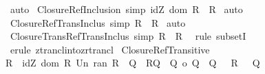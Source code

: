 \begin{isabellebody}
\isamarkupfalse%
\ auto\isanewline
{}\isamarkupfalse%
%
\endisatagproof
{\isafoldproof}%
%
\isadelimproof
\isanewline
%
\endisadelimproof
\isanewline
{}\isamarkupfalse%
\ Closure{\isacharunderscore}Ref{\isacharunderscore}Inclusion\ {\isacharbrackleft}simp{\isacharbrackright}{\isacharcolon}\ {\isachardoublequoteopen}idZ\ {\isacharparenleft}dom\ R{\isacharparenright}\ {\isacharless}{\isacharequal}\ R{\isacharpercent}{\isacharasterisk}{\isachardoublequoteclose}\isanewline
%
\isadelimproof
%
\endisadelimproof
%
\isatagproof
{}\isamarkupfalse%
\ auto\isanewline
{}\isamarkupfalse%
%
\endisatagproof
{\isafoldproof}%
%
\isadelimproof
\ \isanewline
%
\endisadelimproof
\isanewline
{}\isamarkupfalse%
\ Closure{\isacharunderscore}RefTrans{\isacharunderscore}Inclus\ {\isacharbrackleft}simp{\isacharbrackright}{\isacharcolon}\ {\isachardoublequoteopen}R\ {\isacharless}{\isacharequal}\ R{\isacharpercent}{\isacharasterisk}{\isachardoublequoteclose}\isanewline
%
\isadelimproof
%
\endisadelimproof
%
\isatagproof
{}\isamarkupfalse%
\ auto\isanewline
{}\isamarkupfalse%
%
\endisatagproof
{\isafoldproof}%
%
\isadelimproof
\isanewline
%
\endisadelimproof
\isanewline
{}\isamarkupfalse%
\ Closure{\isacharunderscore}Trans{\isacharunderscore}RefTrans{\isacharunderscore}Inclus\ {\isacharbrackleft}simp{\isacharbrackright}{\isacharcolon}\ {\isachardoublequoteopen}R{\isacharpercent}{\isacharplus}\ {\isacharless}{\isacharequal}\ R{\isacharpercent}{\isacharasterisk}\ {\isachardoublequoteclose}\isanewline
%
\isadelimproof
%
\endisadelimproof
%
\isatagproof
{}\isamarkupfalse%
\ {\isacharparenleft}rule\ subsetI{\isacharparenright}\ \isanewline
{}\isamarkupfalse%
\ {\isacharparenleft}erule\ ztrancl{\isacharunderscore}into{\isacharunderscore}zrtrancl{\isacharparenright}\isanewline
{}\isamarkupfalse%
%
\endisatagproof
{\isafoldproof}%
%
\isadelimproof
\isanewline
%
\endisadelimproof
\isanewline
\isanewline
\isanewline
\isanewline
\isanewline
\isanewline
{}\isamarkupfalse%
\ Closure{\isacharunderscore}RefTransitive\ {\isacharcolon}\ \isanewline
{\isachardoublequoteopen}{\isacharbang}{\isacharbang}R{\isachardot}\ {\isacharbrackleft}{\isacharbar}\ {\isacharparenleft}idZ\ {\isacharparenleft}dom\ R\ Un\ ran\ R{\isacharparenright}\ {\isacharless}{\isacharequal}\ Q{\isacharparenright}\ {\isacharsemicolon}\ {\isacharparenleft}R{\isacharless}{\isacharequal}Q{\isacharparenright}\ {\isacharsemicolon}\ {\isacharparenleft}{\isacharparenleft}Q\ {\isacharpercent}o\ Q{\isacharparenright}\ {\isacharless}{\isacharequal}\ Q{\isacharparenright}\ {\isacharbar}{\isacharbrackright}\ {\isacharequal}{\isacharequal}{\isachargreater}\ {\isacharparenleft}{\isacharparenleft}R{\isacharpercent}{\isacharasterisk}\ {\isacharparenright}\ {\isacharless}{\isacharequal}\ Q{\isacharparenright}{\isachardoublequoteclose}\isanewline

\end{isabellebody}
